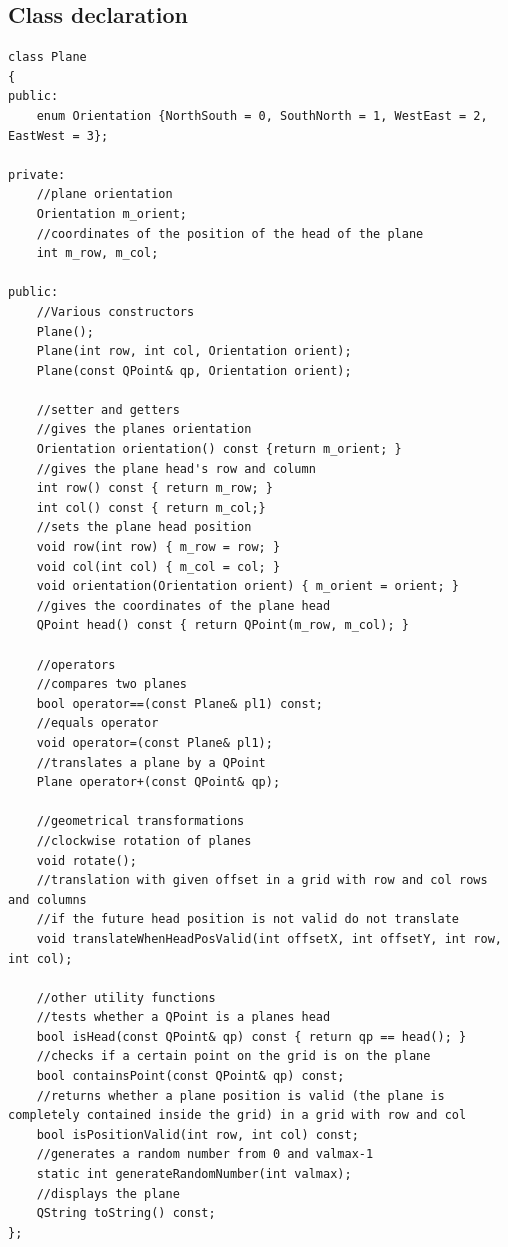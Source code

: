 \documentclass{article}
\begin{document}
\subsection{Class declaration}
\begin{lstlisting}[caption = {Plane class declaration}, captionpos = b, label=plane_declaration]
class Plane
{
public:
    enum Orientation {NorthSouth = 0, SouthNorth = 1, WestEast = 2, EastWest = 3};

private:
    //plane orientation
    Orientation m_orient;
    //coordinates of the position of the head of the plane
    int m_row, m_col;

public:
    //Various constructors
    Plane();
    Plane(int row, int col, Orientation orient);
    Plane(const QPoint& qp, Orientation orient);

    //setter and getters
    //gives the planes orientation
    Orientation orientation() const {return m_orient; }
    //gives the plane head's row and column
    int row() const { return m_row; }
    int col() const { return m_col;}
    //sets the plane head position
    void row(int row) { m_row = row; }
    void col(int col) { m_col = col; }
    void orientation(Orientation orient) { m_orient = orient; }
    //gives the coordinates of the plane head
    QPoint head() const { return QPoint(m_row, m_col); }

    //operators
    //compares two planes
    bool operator==(const Plane& pl1) const;
    //equals operator
    void operator=(const Plane& pl1);
    //translates a plane by a QPoint
    Plane operator+(const QPoint& qp);

    //geometrical transformations
    //clockwise rotation of planes
    void rotate();
    //translation with given offset in a grid with row and col rows and columns
    //if the future head position is not valid do not translate
    void translateWhenHeadPosValid(int offsetX, int offsetY, int row, int col);

    //other utility functions
    //tests whether a QPoint is a planes head
    bool isHead(const QPoint& qp) const { return qp == head(); }
    //checks if a certain point on the grid is on the plane
    bool containsPoint(const QPoint& qp) const;
    //returns whether a plane position is valid (the plane is completely contained inside the grid) in a grid with row and col
    bool isPositionValid(int row, int col) const;
    //generates a random number from 0 and valmax-1
    static int generateRandomNumber(int valmax);
    //displays the plane
    QString toString() const;
};
\end{lstlisting}
\end{document}
